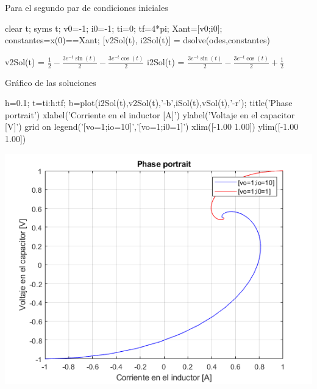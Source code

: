 \documentclass[10pt,a4paper]{article} %
\begin{document}
\begin{par}
	\begin{flushleft}
		Para el segundo par de condiciones iniciales
	\end{flushleft}
\end{par}

\begin{matlabcode}
	clear t;
	syms t;
	v0=-1;
	i0=-1;
	ti=0;
	tf=4*pi;
	Xant=[v0;i0];
	constantes=x(0)==Xant;
	[v2Sol(t), i2Sol(t)] = dsolve(odes,constantes)
\end{matlabcode}
\begin{matlabsymbolicoutput}
	v2Sol(t) = 
	$\displaystyle \frac{1}{2}-\frac{3 e^{-t}  \sin \left(t\right)}{2}-\frac{3 e^{-t}  \cos \left(t\right)}{2}$
	i2Sol(t) = 
	$\displaystyle \frac{3 e^{-t}  \sin \left(t\right)}{2}-\frac{3 e^{-t}  \cos \left(t\right)}{2}+\frac{1}{2}$
\end{matlabsymbolicoutput}

\begin{par}
	\begin{flushleft}
		Gráfico de las soluciones
	\end{flushleft}
\end{par}

\begin{matlabcode}
	h=0.1;
	t=ti:h:tf;
	b=plot(i2Sol(t),v2Sol(t),'-b',iSol(t),vSol(t),'-r');
	title('Phase portrait')
	xlabel('Corriente en el inductor [A]')
	ylabel('Voltaje en el capacitor [V]')
	grid on
	legend({'[vo=1;io=10]','[vo=1;i0=1]'})
	xlim([-1.00 1.00])
	ylim([-1.00 1.00])
\end{matlabcode}
\begin{center}
	\includegraphics[width=\maxwidth{56.196688409433015em}]{figure_0_01}
\end{center}
	
\end{document}
